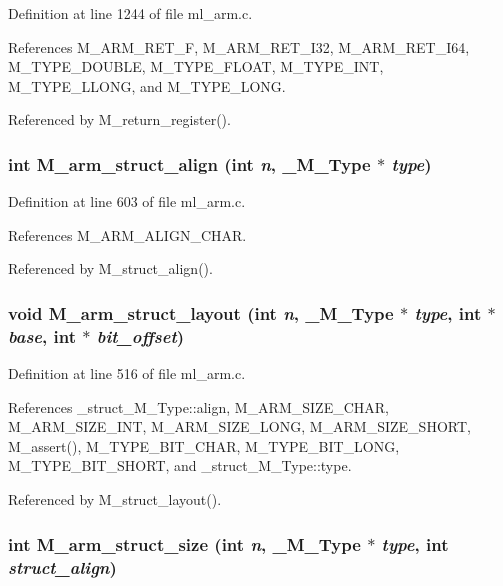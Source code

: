 Definition at line 1244 of file ml\_\-arm.c.

References M\_\-ARM\_\-RET\_\-F, M\_\-ARM\_\-RET\_\-I32, M\_\-ARM\_\-RET\_\-I64, M\_\-TYPE\_\-DOUBLE, M\_\-TYPE\_\-FLOAT, M\_\-TYPE\_\-INT, M\_\-TYPE\_\-LLONG, and M\_\-TYPE\_\-LONG.

Referenced by M\_\-return\_\-register().
\subsubsection{\setlength{\rightskip}{0pt plus 5cm}int M\_\-arm\_\-struct\_\-align (int {\em n}, \bf{\_\-M\_\-Type} $\ast$ {\em type})}\label{ml__arm_8c_d23e2433a208747d34bed1c2f7f72520}




Definition at line 603 of file ml\_\-arm.c.

References M\_\-ARM\_\-ALIGN\_\-CHAR.

Referenced by M\_\-struct\_\-align().
\subsubsection{\setlength{\rightskip}{0pt plus 5cm}void M\_\-arm\_\-struct\_\-layout (int {\em n}, \bf{\_\-M\_\-Type} $\ast$ {\em type}, int $\ast$ {\em base}, int $\ast$ {\em bit\_\-offset})}\label{ml__arm_8c_6f9b01f2d38f36a80bae22807f26911c}




Definition at line 516 of file ml\_\-arm.c.

References \_\-struct\_\-M\_\-Type::align, M\_\-ARM\_\-SIZE\_\-CHAR, M\_\-ARM\_\-SIZE\_\-INT, M\_\-ARM\_\-SIZE\_\-LONG, M\_\-ARM\_\-SIZE\_\-SHORT, M\_\-assert(), M\_\-TYPE\_\-BIT\_\-CHAR, M\_\-TYPE\_\-BIT\_\-LONG, M\_\-TYPE\_\-BIT\_\-SHORT, and \_\-struct\_\-M\_\-Type::type.

Referenced by M\_\-struct\_\-layout().
\subsubsection{\setlength{\rightskip}{0pt plus 5cm}int M\_\-arm\_\-struct\_\-size (int {\em n}, \bf{\_\-M\_\-Type} $\ast$ {\em type}, int {\em struct\_\-align})}\label{ml__arm_8c_67a83835eaa776865b9cc6f8d6a7e50d}




